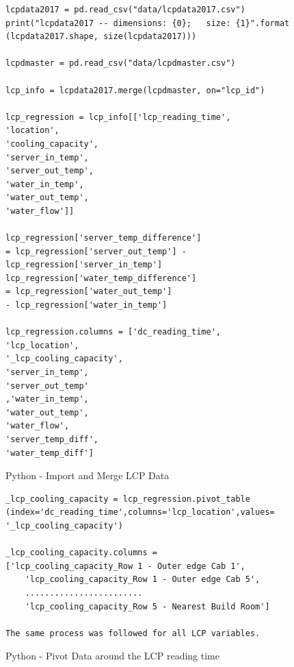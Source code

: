 \documentclass[12pt]{scrartcl}
\begin{document}
\begin{listing}[H]
\begin{verbatim}
lcpdata2017 = pd.read_csv("data/lcpdata2017.csv")
print("lcpdata2017 -- dimensions: {0};   size: {1}".format
(lcpdata2017.shape, size(lcpdata2017)))

lcpdmaster = pd.read_csv("data/lcpdmaster.csv")

lcp_info = lcpdata2017.merge(lcpdmaster, on="lcp_id")

lcp_regression = lcp_info[['lcp_reading_time',
'location',
'cooling_capacity',
'server_in_temp',
'server_out_temp',
'water_in_temp',
'water_out_temp',
'water_flow']]

lcp_regression['server_temp_difference'] 
= lcp_regression['server_out_temp'] - 
lcp_regression['server_in_temp']
lcp_regression['water_temp_difference'] 
= lcp_regression['water_out_temp'] 
- lcp_regression['water_in_temp']

lcp_regression.columns = ['dc_reading_time',
'lcp_location',
'_lcp_cooling_capacity',
'server_in_temp',
'server_out_temp'
,'water_in_temp',
'water_out_temp',
'water_flow',
'server_temp_diff',
'water_temp_diff']

\end{verbatim}
\caption{Python - Import and Merge LCP Data}
\label{list:[Python - Import and Merge LCP Data]}
\end{listing}


\begin{listing}[H]
\begin{verbatim}
_lcp_cooling_capacity = lcp_regression.pivot_table
(index='dc_reading_time',columns='lcp_location',values=
'_lcp_cooling_capacity')

_lcp_cooling_capacity.columns = 
['lcp_cooling_capacity_Row 1 - Outer edge Cab 1',
    'lcp_cooling_capacity_Row 1 - Outer edge Cab 5', 
    ........................
    'lcp_cooling_capacity_Row 5 - Nearest Build Room']
    
The same process was followed for all LCP variables.

\end{verbatim}
\caption{Python - Pivot Data around the LCP reading time}
\label{list:[Python - Pivot Data around the LCP reading time]}
\end{listing}
\end{document}
